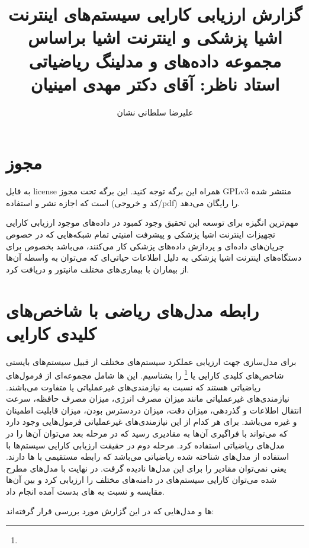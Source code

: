\documentclass[a4paper]{article}
\title{گزارش ارزیابی کارایی سیستم‌های اینترنت اشیا پزشکی و اینترنت اشیا براساس
مجموعه داده‌های \lr{CICIoMT2024} و مدلینگ ریاضیاتی \\ استاد ناظر: آقای دکتر مهدی
امینیان}
\author{علیرضا سلطانی نشان}
\begin{document}
\maketitle

\section*{مجوز}

به فایل license همراه این برگه توجه کنید. این برگه تحت مجوز GPLv3 منتشر شده است
که اجازه نشر و استفاده (کد و خروجی/pdf) را رایگان می‌دهد.

\tableofcontents
\listoffigures
\listoftables

مهم‌ترین انگیزه برای توسعه این تحقیق وجود کمبود در داده‌های موجود ارزیابی کارایی
تجهیزات اینترنت اشیا پزشکی و پیشرفت امنیتی تمام شبکه‌هایی که در خصوص جریان‌های
داده‌ای و پردازش داده‌های پزشکی کار می‌کنند، می‌باشد بخصوص برای دستگاه‌های
اینترنت اشیا پزشکی به دلیل اطلاعات حیاتی‌ای که می‌توان به واسطه آن‌ها از بیماران
با بیماری‌های مختلف مانیتور و دریافت کرد.

\newpage

\section{رابطه مدل‌های ریاضی با شاخص‌های کلیدی کارایی}

برای مدل‌سازی جهت ارزیابی عملکرد سیستم‌های مختلف از قبیل سیستم‌های 
بایستی شاخص‌های کلیدی کارایی یا  \footnote{} را بشناسیم. این ها شامل مجموعه‌ای از فرمول‌های ریاضیاتی
هستند که نسبت به نیازمندی‌های غیرعملیاتی یا 
متفاوت می‌باشند. نیازمندی‌های غیرعملیاتی مانند میزان مصرف انرژی، میزان مصرف
حافظه، سرعت انتقال اطلاعات و گذردهی، میزان دقت، میزان دردسترس بودن، میزان قابلیت
اطمینان و غیره می‌باشد. برای هر کدام از این نیازمندی‌های غیرعملیاتی فرمول‌هایی
وجود دارد که می‌تواند با فراگیری آن‌ها به مقادیری رسید که در مرحله بعد می‌توان
آن‌ها را در مدل‌های ریاضیاتی استفاده کرد.  مرحله دوم در حقیقت ارزیابی کارایی
سیستم‌ها با استفاده از مدل‌های شناخته شده ریاضیاتی می‌باشد که رابطه مستقیمی با
‌ها دارند. یعنی ‌نمی‌توان مقادیر  را برای این مدل‌ها نادیده
گرفت. در نهایت با مدل‌های مطرح شده می‌توان کارایی سیستم‌های  در
دامنه‌های مختلف را ارزیابی کرد و بین آن‌ها مقایسه و  نسبت به
های بدست آمده انجام داد.

ها و مدل‌هایی که در این گزارش مورد بررسی قرار گرفته‌اند:
\end{document}
